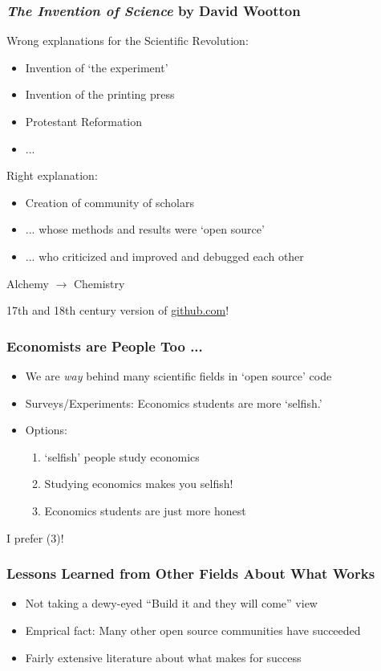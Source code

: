 \documentclass[public]{beamer}
\begin{document}
\begin{frame}
\frametitle{{\it The Invention of Science} by David Wootton}

Wrong explanations for the Scientific Revolution: \pause 
\begin{itemize}
\item Invention of `the experiment'
\item Invention of the printing press
\item Protestant Reformation
\item ... 
\end{itemize}
\medskip\medskip

\pause 
Right explanation:
\begin{itemize}
\item Creation of community of scholars
\item ... whose methods and results were `open source'
\item ... who criticized and improved and debugged each other
\end{itemize}

\medskip
\pause
Alchemy $\rightarrow$ Chemistry

\medskip
\pause 
17th and 18th century version of \href{http://github.com}{github.com}!

\end{frame}

\begin{frame}
\frametitle{Economists are People Too ...}

\begin{itemize} \pause 
\item We are {\it way} behind many scientific fields in `open source' code
\item Surveys/Experiments: Economics students are more `selfish.'
\item Options: \pause
\begin{enumerate}
\item `selfish' people study economics
\item Studying economics makes you selfish!
\item Economics students are just more honest
\end{enumerate}
\end{itemize}

\pause I prefer (3)!

\end{frame}

\begin{frame}
\frametitle{Lessons Learned from Other Fields About What Works}

\begin{itemize}
\item Not taking a dewy-eyed ``Build it and they will come'' view
\item Emprical fact: Many other open source communities have succeeded
\item Fairly extensive literature about what makes for success
\end{itemize}

\end{frame}
\end{document}
